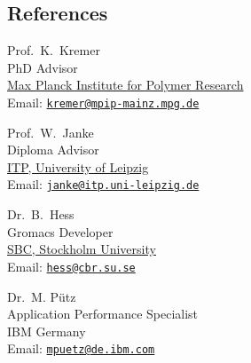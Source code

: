 \documentclass{article}
\begin{document}
\subsection*{References}

\begin{minipage}{0.45\linewidth}
Prof.\ K.\ Kremer
\vspace{-2mm}\\
{\tiny PhD Advisor}\\
\href{http://www.mpip-mainz.mpg.de}{Max Planck Institute for Polymer Research} \\
Email: \href{mailto:kremer@mpip-mainz.mpg.de}{\tt kremer@mpip-mainz.mpg.de}
\end{minipage}
\begin{minipage}{0.45\linewidth}
Prof.\ W.\ Janke
\vspace{-2mm}\\
{\tiny Diploma Advisor}\\
\href{http://www.physik.uni-leipzig.de/~janke/}{ITP, University of Leipzig} \\
Email: \href{mailto:janke@itp.uni-leipzig.de}{\tt janke@itp.uni-leipzig.de}
\end{minipage}

\vspace{2ex}
\begin{minipage}{0.45\linewidth}
Dr.\ B.\ Hess
\vspace{-2mm}\\
{\tiny Gromacs Developer}\\
\href{http://www.sbc.su.se/}{SBC, Stockholm University} \\
Email: \href{mailto:hess@cbr.su.se}{\tt hess@cbr.su.se}
\end{minipage}
\begin{minipage}{0.45\linewidth}
Dr.\ M. P{\"u}tz
\vspace{-2mm}\\
{\tiny Application Performance Specialist}\\
IBM Germany \\
Email: \href{mailto:mpuetz@de.ibm.com}{\tt mpuetz@de.ibm.com}
\end{minipage}
\end{document}
